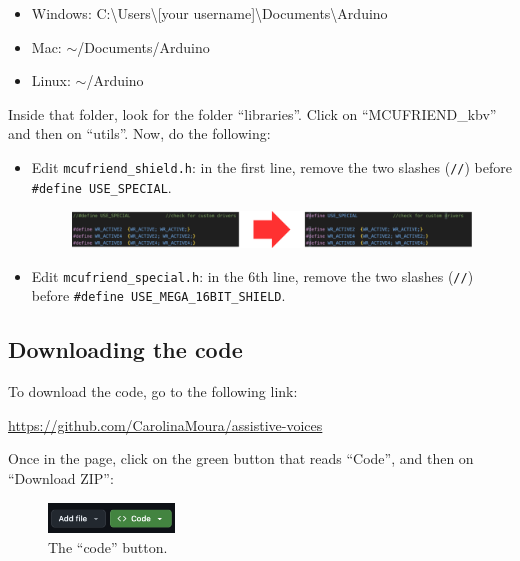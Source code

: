 \documentclass{article}
\begin{document}
\begin{itemize}
    \item Windows: C:\textbackslash Users\textbackslash [your username]\textbackslash Documents\textbackslash Arduino
    \item Mac: \(\sim \)/Documents/Arduino
    \item Linux: \(\sim \)/Arduino
\end{itemize}

Inside that folder, look for the folder ``libraries''. Click on ``MCUFRIEND\_kbv'' and then on ``utils''. Now, do the following:

\begin{itemize}
    \item Edit \texttt{mcufriend\_shield.h}: in the first line, remove the two slashes (\texttt{//}) before \texttt{\#define USE\_SPECIAL}.
    \begin{figure}[h]
        \centering
        \includegraphics[width=1.3\textwidth]{../images/mcufriend_shield.png}
        \end{figure}
    \item Edit \texttt{mcufriend\_special.h}: in the 6th line, remove the two slashes (\texttt{//}) before \texttt{\#define USE\_MEGA\_16BIT\_SHIELD}.
\end{itemize}

\subsection{Downloading the code}
To download the code, go to the following link:

\href{https://github.com/CarolinaMoura/assistive-voices}{https://github.com/CarolinaMoura/assistive-voices}

Once in the page, click on the green button that reads ``Code'', and then on ``Download ZIP'':

\begin{figure}[h]
\centering
\includegraphics[width=0.3\textwidth]{../images/code.png}
\caption{The ``code'' button.}
\end{figure}
\end{document}
